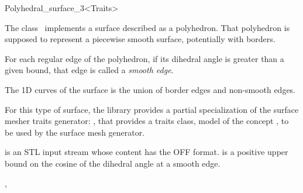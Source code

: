 \begin{ccRefClass}{Polyhedral_surface_3<Traits>}

\ccDefinition

The class \ccRefName\  implements a surface described as a polyhedron. That
polyhedron is supposed to represent a piecewise smooth surface, potentially
with borders.

For each regular edge of the polyhedron, if its dihedral angle is greater
than a given bound, that edge is called a \emph{smooth edge}.

The 1D curves of the surface is the union of border edges and non-smooth
edges.

For this type of surface, the library provides a partial specialization
of the  surface mesher traits generator:
,
that provides a traits class, model of the concept
, to be used by the surface mesh generator.


\ccCreation
{}

{ is an STL input stream whose content has the OFF
  format.  is a positive upper bound on the cosine of the
  dihedral angle at a smooth edge.}

\ccSeeAlso
{},\\
 \\
\end{ccRefClass}
